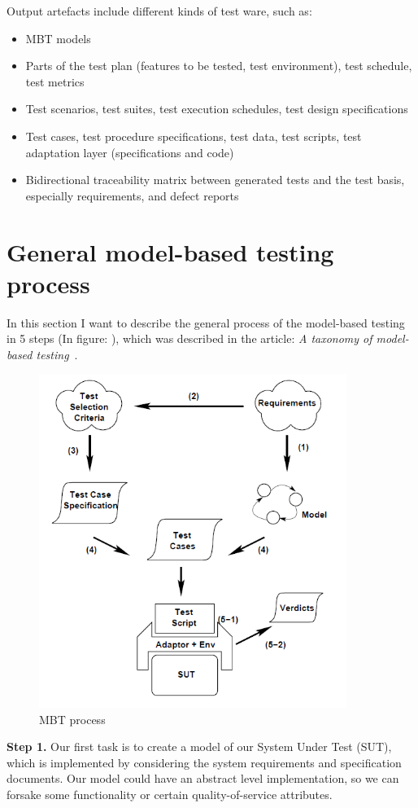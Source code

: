 Output artefacts include different kinds of test ware, such as:
\begin{itemize}
	\item  MBT models
	\item  Parts of the test plan (features to be tested, test environment), test schedule, test metrics
	\item  Test scenarios, test suites, test execution schedules, test design specifications
	\item  Test cases, test procedure specifications, test data, test scripts, test adaptation layer (specifications and code)
	\item  Bidirectional traceability matrix between generated tests and the test basis, especially requirements, and defect reports
\end{itemize}

\section{General model-based testing process}

In this section I want to describe the general process of the model-based testing in 5 steps (In figure: ), which was described in the article: \textit{A taxonomy of model-based testing}~\cite{Taxonomy}.

\begin{figure}[!ht]
	\centering
	\includegraphics[width=100mm, keepaspectratio]{figures/MBTprocess.png}
	\caption{MBT process~\cite{Taxonomy}}
	\label{fig:mbtprocess} 
\end{figure}
%
\textbf{Step 1.}
Our first task is to create a model of our System Under Test (SUT), which is implemented by considering the system requirements and specification documents. Our model could have an abstract level implementation, so we can forsake some functionality or certain quality-of-service attributes.

